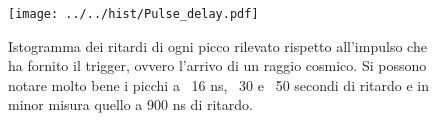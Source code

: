\begin{figure}[h] \centering \texttt{[image: ../../hist/Pulse\_delay.pdf]}\caption{Istogramma dei ritardi di ogni picco rilevato rispetto all'impulso che ha fornito il trigger, ovvero l'arrivo di un raggio cosmico. Si possono notare molto bene i picchi a ~16 ns, ~30 e ~50 secondi di ritardo e in minor misura quello a 900 ns di ritardo.}\label{hist:Pulse_delay} \end{figure}

